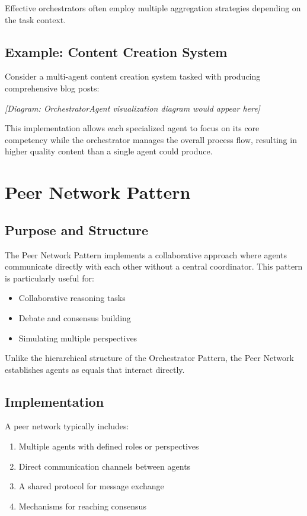 \documentclass[11pt,oneside]{book}
\providecommand{\tightlist}{%
  \setlength{\itemsep}{0pt}\setlength{\parskip}{0pt}}
\begin{document}
Effective orchestrators often employ multiple aggregation strategies
depending on the task context.

\subsection{Example: Content Creation
System}\label{example-content-creation-system}

Consider a multi-agent content creation system tasked with producing
comprehensive blog posts:

\emph{{[}Diagram: OrchestratorAgent visualization diagram would appear
here{]}}

This implementation allows each specialized agent to focus on its core
competency while the orchestrator manages the overall process flow,
resulting in higher quality content than a single agent could produce.

\section{Peer Network Pattern}\label{peer-network-pattern}

\subsection{Purpose and Structure}\label{purpose-and-structure-3}

The Peer Network Pattern implements a collaborative approach where
agents communicate directly with each other without a central
coordinator. This pattern is particularly useful for:

\begin{itemize}
\tightlist
\item
  Collaborative reasoning tasks
\item
  Debate and consensus building
\item
  Simulating multiple perspectives
\end{itemize}

Unlike the hierarchical structure of the Orchestrator Pattern, the Peer
Network establishes agents as equals that interact directly.

\subsection{Implementation}\label{implementation-2}

A peer network typically includes:

\begin{enumerate}
\def\labelenumi{\arabic{enumi}.}
\tightlist
\item
  Multiple agents with defined roles or perspectives
\item
  Direct communication channels between agents
\item
  A shared protocol for message exchange
\item
  Mechanisms for reaching consensus
\end{enumerate}
\end{document}
